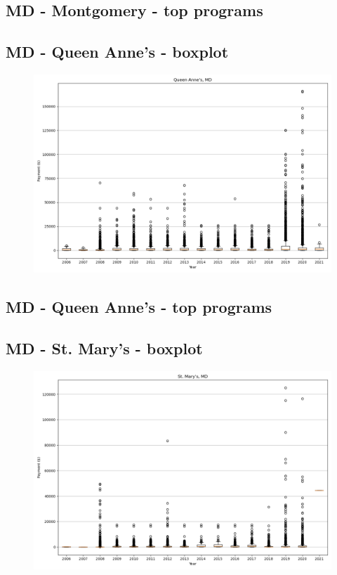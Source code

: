 \subsection*{MD - Montgomery - top programs}

\newpage
\subsection*{MD - Queen Anne's - boxplot}
\begin{figure}[h]
\centering
\includegraphics[width=7in]{../output/boxplots/counties/Queen Anne's-MD_boxplot.png}
\end{figure}


\subsection*{MD - Queen Anne's - top programs}

\newpage
\subsection*{MD - St. Mary's - boxplot}
\begin{figure}[h]
\centering
\includegraphics[width=7in]{../output/boxplots/counties/St. Mary's-MD_boxplot.png}
\end{figure}


